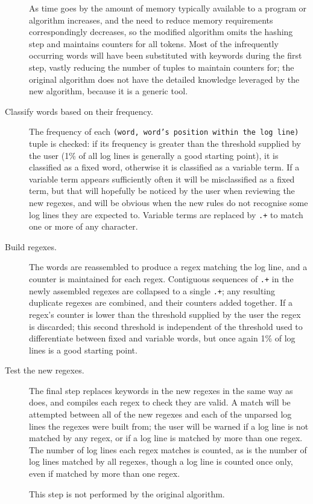 \begin{description}
        As time goes by the amount of memory typically available to a
        program or algorithm increases, and the need to reduce memory
        requirements correspondingly decreases, so the modified algorithm
        omits the hashing step and maintains counters for all tokens.  Most
        of the infrequently occurring words will have been substituted with
        keywords during the first step, vastly reducing the number of
        tuples to maintain counters for; the original algorithm does not
        have the detailed knowledge leveraged by the new algorithm, because
        it is a generic tool.

    \item [Classify words based on their frequency.]  The frequency of each
        \texttt{(word, word's position within the log line)} tuple is
        checked: if its frequency is greater than the threshold supplied by
        the user (1\% of all log lines is generally a good starting point),
        it is classified as a fixed word, otherwise it is classified as a
        variable term.  If a variable term appears sufficiently often it
        will be misclassified as a fixed term, but that will hopefully be
        noticed by the user when reviewing the new regexes, and will be
        obvious when the new rules do not recognise some log lines they are
        expected to.  Variable terms are replaced by \texttt{.+} to match
        one or more of any character.

    \item [Build regexes.]  The words are reassembled to produce a regex
        matching the log line, and a counter is maintained for each regex.
        Contiguous sequences of \texttt{.+} in the newly assembled regexes
        are collapsed to a single \texttt{.+}; any resulting duplicate
        regexes are combined, and their counters added together.  If a
        regex's counter is lower than the threshold supplied by the user
        the regex is discarded; this second threshold is independent of the
        threshold used to differentiate between fixed and variable words,
        but once again 1\% of log lines is a good starting point.

    \item [Test the new regexes.]  The final step replaces keywords in the
        new regexes in the same way as \parsername{} does, and compiles
        each regex to check they are valid.  A match will be attempted
        between all of the new regexes and each of the unparsed log lines
        the regexes were built from; the user will be warned if a log line
        is not matched by any regex, or if a log line is matched by more
        than one regex.  The number of log lines each regex matches is
        counted, as is the number of log lines matched by all regexes,
        though a log line is counted once only, even if matched by more
        than one regex.

        This step is not performed by the original algorithm.

\end{description}

